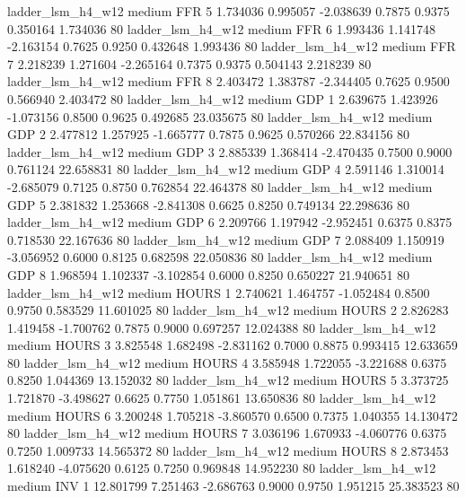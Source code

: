      ladder_lsm_h4_w12     medium      FFR                 5  1.734036 0.995057 -2.038639 0.7875 0.9375  0.350164    1.734036 80
     ladder_lsm_h4_w12     medium      FFR                 6  1.993436 1.141748 -2.163154 0.7625 0.9250  0.432648    1.993436 80
     ladder_lsm_h4_w12     medium      FFR                 7  2.218239 1.271604 -2.265164 0.7375 0.9375  0.504143    2.218239 80
     ladder_lsm_h4_w12     medium      FFR                 8  2.403472 1.383787 -2.344405 0.7625 0.9500  0.566940    2.403472 80
     ladder_lsm_h4_w12     medium      GDP                 1  2.639675 1.423926 -1.073156 0.8500 0.9625  0.492685   23.035675 80
     ladder_lsm_h4_w12     medium      GDP                 2  2.477812 1.257925 -1.665777 0.7875 0.9625  0.570266   22.834156 80
     ladder_lsm_h4_w12     medium      GDP                 3  2.885339 1.368414 -2.470435 0.7500 0.9000  0.761124   22.658831 80
     ladder_lsm_h4_w12     medium      GDP                 4  2.591146 1.310014 -2.685079 0.7125 0.8750  0.762854   22.464378 80
     ladder_lsm_h4_w12     medium      GDP                 5  2.381832 1.253668 -2.841308 0.6625 0.8250  0.749134   22.298636 80
     ladder_lsm_h4_w12     medium      GDP                 6  2.209766 1.197942 -2.952451 0.6375 0.8375  0.718530   22.167636 80
     ladder_lsm_h4_w12     medium      GDP                 7  2.088409 1.150919 -3.056952 0.6000 0.8125  0.682598   22.050836 80
     ladder_lsm_h4_w12     medium      GDP                 8  1.968594 1.102337 -3.102854 0.6000 0.8250  0.650227   21.940651 80
     ladder_lsm_h4_w12     medium    HOURS                 1  2.740621 1.464757 -1.052484 0.8500 0.9750  0.583529   11.601025 80
     ladder_lsm_h4_w12     medium    HOURS                 2  2.826283 1.419458 -1.700762 0.7875 0.9000  0.697257   12.024388 80
     ladder_lsm_h4_w12     medium    HOURS                 3  3.825548 1.682498 -2.831162 0.7000 0.8875  0.993415   12.633659 80
     ladder_lsm_h4_w12     medium    HOURS                 4  3.585948 1.722055 -3.221688 0.6375 0.8250  1.044369   13.152032 80
     ladder_lsm_h4_w12     medium    HOURS                 5  3.373725 1.721870 -3.498627 0.6625 0.7750  1.051861   13.650836 80
     ladder_lsm_h4_w12     medium    HOURS                 6  3.200248 1.705218 -3.860570 0.6500 0.7375  1.040355   14.130472 80
     ladder_lsm_h4_w12     medium    HOURS                 7  3.036196 1.670933 -4.060776 0.6375 0.7250  1.009733   14.565372 80
     ladder_lsm_h4_w12     medium    HOURS                 8  2.873453 1.618240 -4.075620 0.6125 0.7250  0.969848   14.952230 80
     ladder_lsm_h4_w12     medium      INV                 1 12.801799 7.251463 -2.686763 0.9000 0.9750  1.951215   25.383523 80
